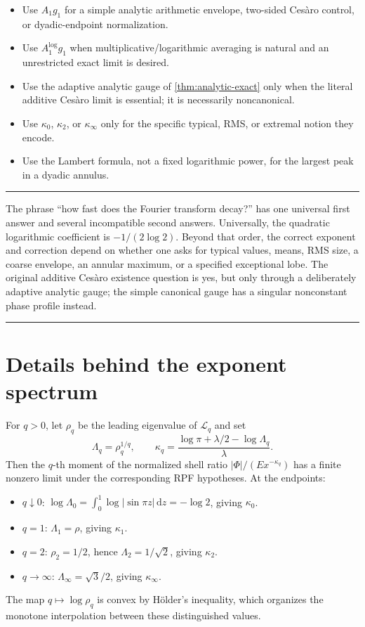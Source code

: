 \documentclass[11pt,oneside]{article}
\theoremstyle{definition}
\theoremstyle{remark}
\newcommand{\dd}{\,\mathrm d}
\newcommand{\Lop}{\mathcal L}
\newenvironment{boxedremark}{%
  \par\smallskip\noindent\begin{center}\begin{minipage}{0.94\textwidth}%
  \color{black}\hrule\vspace{0.6em}\small
}{%
  \vspace{0.6em}\hrule\end{minipage}\end{center}\smallskip
}
\begin{document}
\begin{itemize}
\item Use \(A_1g_1\) for a simple analytic arithmetic envelope, two-sided
Ces\`aro control, or dyadic-endpoint normalization.
\item Use \(A_1^{\log}g_1\) when multiplicative/logarithmic averaging is
natural and an unrestricted exact limit is desired.
\item Use the adaptive analytic gauge of \cref{thm:analytic-exact} only when the
literal additive Ces\`aro limit is essential; it is necessarily noncanonical.
\item Use \(\kappa_0\), \(\kappa_2\), or \(\kappa_\infty\) only for the
specific typical, RMS, or extremal notion they encode.
\item Use the Lambert formula, not a fixed logarithmic power, for the largest
peak in a dyadic annulus.
\end{itemize}

\begin{boxedremark}
The phrase ``how fast does the Fourier transform decay?'' has one universal
first answer and several incompatible second answers.  Universally, the
quadratic logarithmic coefficient is \(-1/(2\log2)\).  Beyond that order, the
correct exponent and correction depend on whether one asks for typical values,
means, RMS size, a coarse envelope, an annular maximum, or a specified
exceptional lobe.  The original additive Ces\`aro existence question is yes,
but only through a deliberately adaptive analytic gauge; the simple canonical
gauge has a singular nonconstant phase profile instead.
\end{boxedremark}

\appendix

\section{Details behind the exponent spectrum}
\label{app:spectrum}

For \(q>0\), let \(\rho_q\) be the leading eigenvalue of \(\Lop_q\) and set
\begin{equation}
 \Lambda_q=\rho_q^{1/q},
 \qquad
 \kappa_q=\frac{\log\pi+\lambda/2-\log\Lambda_q}{\lambda}.
 \label{eq:q-spectrum}
\end{equation}
Then the \(q\)-th moment of the normalized shell ratio
\(|\Phi|/(E x^{-\kappa_q})\) has a finite nonzero limit under the corresponding
RPF hypotheses.  At the endpoints:
\begin{itemize}
\item \(q\downarrow0\):
\(\log\Lambda_0=\int_0^1\log|\sin\pi z|\dd z=-\log2\), giving
\(\kappa_0\).
\item \(q=1\): \(\Lambda_1=\rho\), giving \(\kappa_1\).
\item \(q=2\): \(\rho_2=1/2\), hence \(\Lambda_2=1/\sqrt2\), giving
\(\kappa_2\).
\item \(q\to\infty\): \(\Lambda_\infty=\sqrt3/2\), giving
\(\kappa_\infty\).
\end{itemize}
The map \(q\mapsto\log\rho_q\) is convex by H\"older's inequality, which
organizes the monotone interpolation between these distinguished values.
\end{document}
